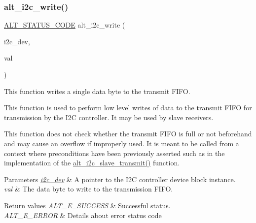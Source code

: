 \subsubsection{\texorpdfstring{alt\_i2c\_write()}{alt\_i2c\_write()}}
{\footnotesize\ttfamily \mbox{\hyperlink{hwlib_8h_abdb0d369f069723ca55d6c94bcaaaa12}{A\+L\+T\+\_\+\+S\+T\+A\+T\+U\+S\+\_\+\+C\+O\+DE}} alt\+\_\+i2c\+\_\+write (\begin{DoxyParamCaption}\item[{\mbox{\hyperlink{structALT__I2C__DEV__s}{A\+L\+T\+\_\+\+I2\+C\+\_\+\+D\+E\+V\+\_\+t}} $\ast$}]{i2c\+\_\+dev,  }\item[{const uint8\+\_\+t}]{val }\end{DoxyParamCaption})}

This function writes a single data byte to the transmit F\+I\+FO.

This function is used to perform low level writes of data to the transmit F\+I\+FO for transmission by the I2C controller. It may be used by slave receivers.

This function does not check whether the transmit F\+I\+FO is full or not beforehand and may cause an overflow if improperly used. It is meant to be called from a context where preconditions have been previously asserted such as in the implementation of the \mbox{\hyperlink{group__ALT__I2C_ga3137e57044cb1f6d1b8ce9b09baf61e3}{alt\+\_\+i2c\+\_\+slave\+\_\+transmit()}} function.


\begin{DoxyParams}{Parameters}
{\em \mbox{\hyperlink{structi2c__dev}{i2c\+\_\+dev}}} & A pointer to the I2C controller device block instance.\\
\hline
{\em val} & The data byte to write to the transmission F\+I\+FO.\\
\hline
\end{DoxyParams}

\begin{DoxyRetVals}{Return values}
{\em A\+L\+T\+\_\+\+E\+\_\+\+S\+U\+C\+C\+E\+SS} & Successful status. \\
\hline
{\em A\+L\+T\+\_\+\+E\+\_\+\+E\+R\+R\+OR} & Details about error status code \\
\hline
\end{DoxyRetVals}
